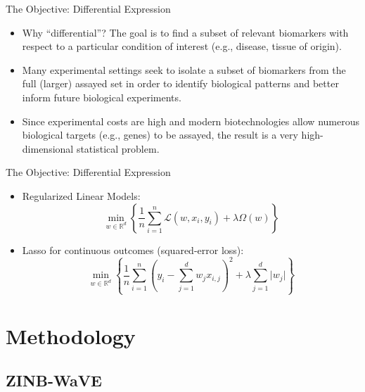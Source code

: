 \documentclass{beamer}
\newcommand{\R}{\mathbb{R}}
\newcommand{\lik}{\mathcal{L}}
\begin{document}
\begin{frame}{The Objective: Differential Expression}

\begin{itemize}
  \itemsep12pt
  \item Why ``differential''? The goal is to find a subset of relevant
    biomarkers with respect to a particular condition of interest (e.g.,
    disease, tissue of origin).
  \item Many experimental settings seek to isolate a subset of biomarkers from
    the full (larger) assayed set in order to identify biological patterns and
    better inform future biological experiments.
  \item Since experimental costs are high and modern biotechnologies allow
    numerous biological targets (e.g., genes) to be assayed, the result is a
    very high-dimensional statistical problem.
\end{itemize}

\end{frame}


\begin{frame}{The Objective: Differential Expression}

\begin{itemize}
  \itemsep12pt
  \item Regularized Linear Models:
    \[
      \min_{w \in \R^d} \left\{ \frac{1}{n} \sum_{i = 1}^n \lik(w, x_i, y_i) +
        \lambda \Omega(w) \right\}
    \]
  \item Lasso for continuous outcomes (squared-error loss):
    \[
      \min_{w \in \R^d} \left\{ \frac{1}{n} \sum_{i = 1}^n \left(y_i - \sum_{j =
        1}^d w_j x_{i,j} \right)^2 + \lambda \sum_{j = 1}^d \lvert w_j \rvert
        \right\}
    \]
\end{itemize}

\end{frame}

\section{Methodology}
\subsection{ZINB-WaVE}
\end{document}
